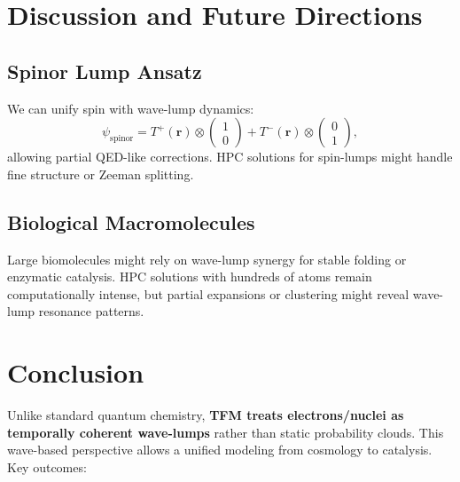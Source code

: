 \documentclass[12pt]{article}
\begin{document}
\section{Discussion and Future Directions}
\label{sec:Discussion}

\subsection{Spinor Lump Ansatz}
We can unify spin with wave-lump dynamics:
\[
  \psi_{\mathrm{spinor}}
  =
  T^+(\mathbf{r}) 
  \otimes
  \begin{pmatrix}
    1\\0
  \end{pmatrix}
  +
  T^-(\mathbf{r})
  \otimes
  \begin{pmatrix}
    0\\1
  \end{pmatrix},
\]
allowing partial QED-like corrections. HPC solutions for spin-lumps might handle fine structure or Zeeman splitting.

\subsection{Biological Macromolecules}
Large biomolecules might rely on wave-lump synergy for stable folding or enzymatic catalysis. HPC solutions with hundreds of atoms remain computationally intense, but partial expansions or clustering might reveal wave-lump resonance patterns.

\section{Conclusion}
\label{sec:Conclusion}

Unlike standard quantum chemistry, \textbf{TFM treats electrons/nuclei as temporally coherent wave-lumps} rather than static probability clouds. This wave-based perspective allows a unified modeling from cosmology to catalysis. Key outcomes:
\end{document}
